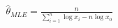 \documentclass[preview]{standalone}
\begin{document}
\begin{align*}
\hat{\theta}_{MLE} = \frac{n}{\sum_{i=1}^n \log x_i - n\log x_0}
\end{align*}
\end{document}
